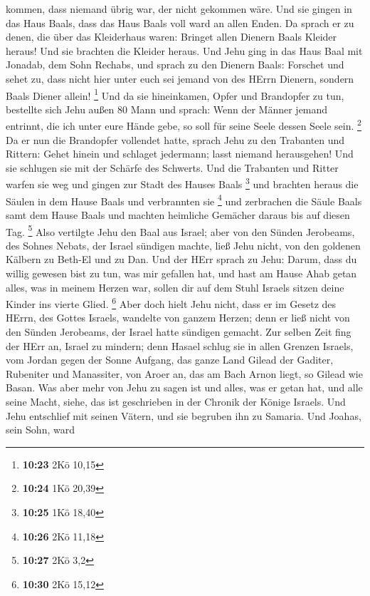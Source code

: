 kommen, dass niemand übrig war, der nicht gekommen wäre. Und sie gingen
in das Haus Baals, dass das Haus Baals voll ward an allen Enden.
 Da sprach er zu denen, die über das Kleiderhaus waren:
Bringet allen Dienern Baals Kleider heraus! Und sie brachten die Kleider
heraus.  Und Jehu ging in das Haus Baal mit Jonadab, dem
Sohn Rechabs, und sprach zu den Dienern Baals: Forschet und sehet zu,
dass nicht hier unter euch sei jemand von des HErrn Dienern, sondern
Baals Diener allein! \footnote{\textbf{10:23} 2Kö 10,15} 
Und da sie hineinkamen, Opfer und Brandopfer zu tun, bestellte sich Jehu
außen 80 Mann und sprach: Wenn der Männer jemand entrinnt, die ich unter
eure Hände gebe, so soll für seine Seele dessen Seele sein. \footnote{\textbf{10:24}
  1Kö 20,39}  Da er nun die Brandopfer vollendet hatte,
sprach Jehu zu den Trabanten und Rittern: Gehet hinein und schlaget
jedermann; lasst niemand herausgehen! Und sie schlugen sie mit der
Schärfe des Schwerts. Und die Trabanten und Ritter warfen sie weg und
gingen zur Stadt des Hauses Baals \footnote{\textbf{10:25} 1Kö 18,40}
 und brachten heraus die Säulen in dem Hause Baals und
verbrannten sie \footnote{\textbf{10:26} 2Kö 11,18}  und
zerbrachen die Säule Baals samt dem Hause Baals und machten heimliche
Gemächer daraus bis auf diesen Tag. \footnote{\textbf{10:27} 2Kö 3,2}
 Also vertilgte Jehu den Baal aus Israel; 
aber von den Sünden Jerobeams, des Sohnes Nebats, der Israel sündigen
machte, ließ Jehu nicht, von den goldenen Kälbern zu Beth-El und zu Dan.
 Und der HErr sprach zu Jehu: Darum, dass du willig gewesen
bist zu tun, was mir gefallen hat, und hast am Hause Ahab getan alles,
was in meinem Herzen war, sollen dir auf dem Stuhl Israels sitzen deine
Kinder ins vierte Glied. \footnote{\textbf{10:30} 2Kö 15,12}
 Aber doch hielt Jehu nicht, dass er im Gesetz des HErrn,
des Gottes Israels, wandelte von ganzem Herzen; denn er ließ nicht von
den Sünden Jerobeams, der Israel hatte sündigen gemacht. 
Zur selben Zeit fing der HErr an, Israel zu mindern; denn Hasael schlug
sie in allen Grenzen Israels,  vom Jordan gegen der Sonne
Aufgang, das ganze Land Gilead der Gaditer, Rubeniter und Manassiter,
von Aroer an, das am Bach Arnon liegt, so Gilead wie Basan.
 Was aber mehr von Jehu zu sagen ist und alles, was er
getan hat, und alle seine Macht, siehe, das ist geschrieben in der
Chronik der Könige Israels.  Und Jehu entschlief mit seinen
Vätern, und sie begruben ihn zu Samaria. Und Joahas, sein Sohn, ward
